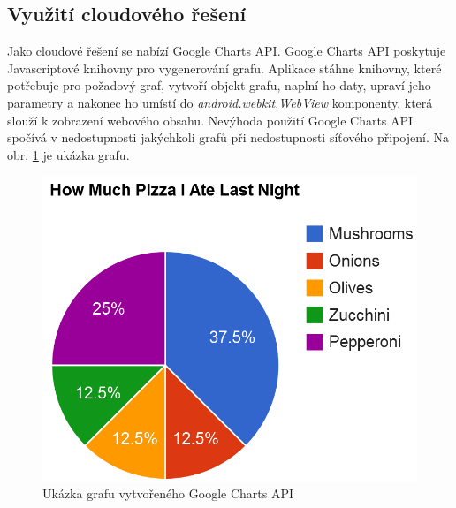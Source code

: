\documentclass{diplomka}
\begin{document}
\subsection{Využití cloudového řešení}
Jako cloudové řešení se nabízí Google Charts API\cite{googlecharts}. Google Charts API poskytuje Javascriptové knihovny pro vygenerování grafu. Aplikace stáhne knihovny, které potřebuje pro požadový graf, vytvoří objekt grafu, naplní ho daty, upraví jeho parametry a nakonec ho umístí do \emph{android.webkit.WebView} komponenty, která slouží k zobrazení webového obsahu. Nevýhoda použití Google Charts API spočívá v nedostupnosti jakýchkoli grafů při nedostupnosti síťového připojení. Na obr. \ref{fig:gcharts} je ukázka grafu.
\begin{figure}[H]
  \centering
  \includegraphics[scale=0.5]{obr/gcharts.png}
\caption{Ukázka grafu vytvořeného Google Charts API}
\label{fig:gcharts}
\end{figure}
\end{document}

